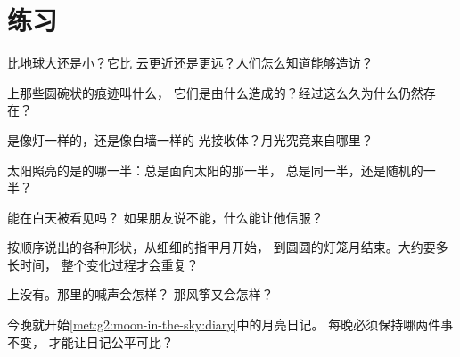 \section{练习}

\begin{exercise}[$\star$]\label{exo:g2:moon-in-the-sky:1}
比地球大还是小？它比
云更近还是更远？人们怎么知道能够造访？
\end{exercise}

\begin{exercise}[$\star$]\label{exo:g2:moon-in-the-sky:2}
上那些圆碗状的痕迹叫什么，
它们是由什么造成的？经过这么久为什么仍然存在？
\end{exercise}

\begin{exercise}[$\star$]\label{exo:g2:moon-in-the-sky:3}
是像灯一样的，还是像白墙一样的
光接收体？月光究竟来自哪里？
\end{exercise}

\begin{exercise}[$\star$]\label{exo:g2:moon-in-the-sky:4}
太阳照亮的是的哪一半：总是面向太阳的那一半，
总是同一半，还是随机的一半？
\end{exercise}

\begin{exercise}[$\star$]\label{exo:g2:moon-in-the-sky:5}
能在白天被看见吗？
如果朋友说不能，什么能让他信服？
\end{exercise}

\begin{exercise}[$\star$]\label{exo:g2:moon-in-the-sky:6}
按顺序说出的各种形状，从细细的指甲月开始，
到圆圆的灯笼月结束。大约要多长时间，
整个变化过程才会重复？
\end{exercise}

\begin{exercise}[$\star$]\label{exo:g2:moon-in-the-sky:7}
上没有。那里的喊声会怎样？
那风筝又会怎样？
\end{exercise}

\begin{exercise}[$\star$]\label{exo:g2:moon-in-the-sky:8}
今晚就开始\cref{met:g2:moon-in-the-sky:diary}中的月亮日记。
每晚必须保持哪两件事不变，
才能让日记公平可比？
\end{exercise}

